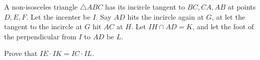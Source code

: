 A non-isosceles triangle $\triangle ABC$ has its incircle tangent to $BC, CA, AB$ at points $D, E, F$.
Let the incenter be $I$. Say $AD$ hits the incircle again at $G$, at let the tangent to the incircle at $G$ hit $AC$ at $H$. Let $IH \cap AD = K$, and let the foot of the perpendicular from $I$ to $AD$ be $L$.

Prove that $IE \cdot IK= IC \cdot IL$.